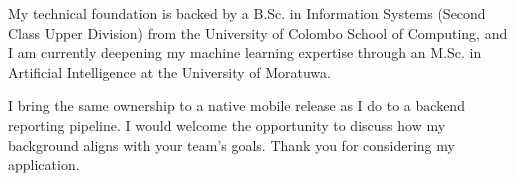 \documentclass[11pt]{article}
\begin{document}
My technical foundation is backed by a B.Sc. in Information Systems (Second Class Upper Division) from the University of Colombo School of Computing, and I am currently deepening my machine learning expertise through an M.Sc. in Artificial Intelligence at the University of Moratuwa.

I bring the same ownership to a native mobile release as I do to a backend reporting pipeline. I would welcome the opportunity to discuss how my background aligns with your team's goals. Thank you for considering my application.

\end{document}

